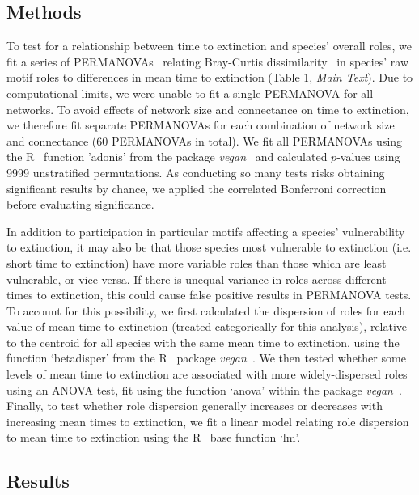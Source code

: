 \documentclass[12pt]{article}
\begin{document}
\begin{spacing}{2.0}
	\subsection*{Methods}


		To test for a relationship between time to extinction and species' overall roles, we fit a series of PERMANOVAs~\citep{Anderson2001} relating Bray-Curtis dissimilarity~\citep{Baker2015,Cirtwill2015} in species' raw motif roles to differences in mean time to extinction (Table 1, \emph{Main Text}).
		Due to computational limits, we were unable to fit a single PERMANOVA for all networks.
		To avoid effects of network size and connectance on time to extinction, we therefore fit separate PERMANOVAs for each combination of network size and connectance (60 PERMANOVAs in total).
		We fit all PERMANOVAs using the R~\citep{R} function 'adonis' from the package \emph{vegan}~\citep{vegan} and calculated $p$-values using 9999 unstratified permutations.
		As conducting so many tests risks obtaining significant results by chance, we applied the correlated Bonferroni correction~\citep{Drezner2016} before evaluating significance.
		
        
        In addition to participation in particular motifs affecting a species' vulnerability to extinction, it may also be that those species most vulnerable to extinction (i.e. short time to extinction) have more variable roles than those which are least vulnerable, or vice versa. 
        If there is unequal variance in roles across different times to extinction, this could cause false positive results in PERMANOVA tests.
        To account for this possibility, we first calculated the dispersion of roles for each value of mean time to extinction (treated categorically for this analysis), relative to the centroid for all species with the same mean time to extinction, using the function `betadisper' from the R~\citep{R} package \emph{vegan}~\citep{vegan}.
        We then tested whether some levels of mean time to extinction are associated with more widely-dispersed roles using an ANOVA test, fit using the function `anova' within the package \emph{vegan}~\citep{vegan}.
        Finally, to test whether role dispersion generally increases or decreases with increasing mean times to extinction, we fit a linear model relating role dispersion to mean time to extinction using the R~\citep{R} base function `lm'.


	\subsection*{Results}



\end{spacing}
\end{document}

